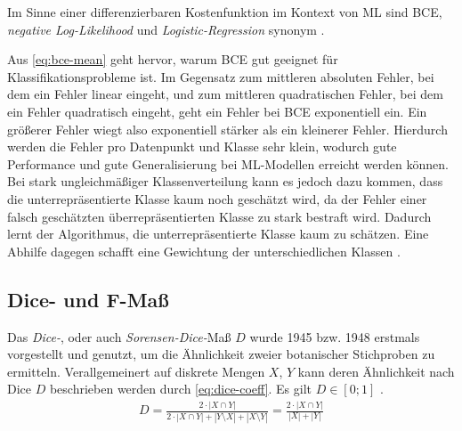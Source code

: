 Im Sinne einer differenzierbaren Kostenfunktion im Kontext von \ac{ML} sind \ac{BCE},
\textit{negative Log-Likelihood} und \textit{Logistic-Regression} synonym \cite[S.~249]{Murphy.2012}. 

Aus \autoref{eq:bce-mean} geht hervor, warum \ac{BCE} gut geeignet für Klassifikationsprobleme ist.
Im Gegensatz zum mittleren absoluten Fehler, bei dem ein Fehler linear eingeht, und zum mittleren quadratischen Fehler,
bei dem ein Fehler quadratisch eingeht, geht ein Fehler bei \ac{BCE} exponentiell ein. 
Ein größerer Fehler wiegt also exponentiell stärker als ein kleinerer Fehler. 
Hierdurch werden die Fehler pro Datenpunkt und Klasse sehr klein, 
wodurch gute Performance und gute Generalisierung bei \ac{ML}-Modellen erreicht werden können. \\

Bei stark ungleichmäßiger Klassenverteilung kann es jedoch dazu kommen, 
dass die unterrepräsentierte Klasse kaum noch geschätzt wird, 
da der Fehler einer falsch geschätzten überrepräsentierten Klasse zu stark bestraft wird.
Dadurch lernt der Algorithmus, die unterrepräsentierte Klasse kaum zu schätzen.
Eine Abhilfe dagegen schafft eine Gewichtung der unterschiedlichen Klassen \cite[S.~4]{Ronneberger.18052015}.

\subsection{Dice- und F-Maß}

Das \textit{Dice-}, oder auch \textit{Sorensen-Dice-}Maß $D$ wurde 1945 bzw. 1948 erstmals vorgestellt und genutzt, um die Ähnlichkeit zweier botanischer Stichproben zu ermitteln. Verallgemeinert auf diskrete Mengen $X$, $Y$ kann deren Ähnlichkeit nach Dice $D$ beschrieben werden durch \autoref{eq:dice-coeff}. Es gilt $D \in [0; 1]$ \cites[S.~33]{Srenson.1948}[S.~297]{Dice.1945}. 
\begin{align}
	\label{eq:dice-coeff} D = \frac{2 \cdot | X \cap Y |}{2 \cdot | X \cap Y | + |Y \setminus X| + |X \setminus Y|} 
	=\frac{2 \cdot | X \cap Y |}{|X| + |Y|}
\end{align} 

